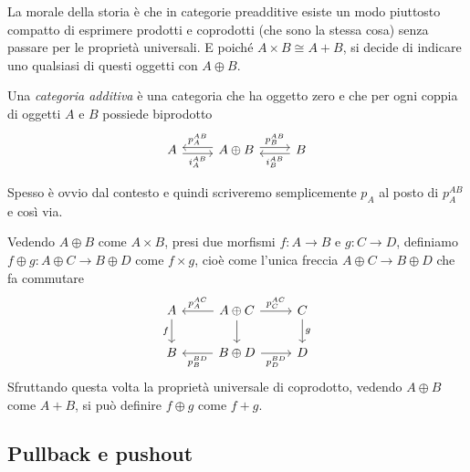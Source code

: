 La morale della storia è che in categorie preadditive esiste un modo
piuttosto compatto di esprimere prodotti e coprodotti (che sono la
stessa cosa) senza passare per le proprietà universali. E poiché
\(A \times B \cong A + B\), si decide di indicare uno qualsiasi di
questi oggetti con \(A \oplus B\).

\begin{definition}
  Una {\em categoria additiva} è una categoria che ha oggetto zero e che
  per ogni coppia di oggetti \(A\) e \(B\) possiede biprodotto
  \[
    \begin{tikzcd}
      A \ar["{i_A^{AB}}", r, shift right, swap] & A \oplus B
      \ar["{p_A^{AB}}", l, shift right, swap] \ar["{p_B^{AB}}", r, shift
      left] & B \ar["{i_B^{AB}}", l, shift left]
    \end{tikzcd}
  \]
\end{definition}

Spesso è ovvio dal contesto e quindi scriveremo semplicemente \(p_A\) al
posto di \(p_A^{AB}\) e così via.

Vedendo \(A \oplus B\) come \(A \times B\), presi due morfismi
\(f : A \to B\) e \(g : C \to D\), definiamo
\(f \oplus g : A \oplus C \to B \oplus D\) come \(f \times g\), cioè
come l'unica freccia \(A \oplus C \to B \oplus D\) che fa commutare
\[
  \begin{tikzcd}
    A \ar["{f}", d, swap] & A \oplus C \ar["{p_A^{AC}}", l, swap]
    \ar["{}", d] \ar["{p_C^{AC}}", r] & C \ar["{g}", d] \\
    B & B \oplus D \ar["{p_B^{BD}}", l] \ar["{p_D^{BD}}", r, swap] & D
  \end{tikzcd}
\]
Sfruttando questa volta la proprietà universale di coprodotto, vedendo
\(A \oplus B\) come \(A + B\), si può definire \(f \oplus g\) come
\(f + g\).


\subsection{Pullback e pushout}

